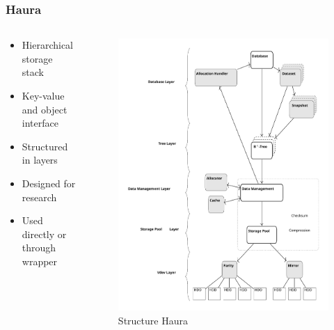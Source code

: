 \documentclass[
	aspectratio=169,
	compress,
]{beamer}
\newcommand{\navframetitle}[1]{\frametitle{#1\hfill{\footnotesize\lastsection{}}}}
\begin{document}
\begin{frame}
	\navframetitle{Haura}
	
	\begin{columns}
		\begin{column}{0.5\textwidth}
			\begin{itemize}
				\item Hierarchical storage stack
				\item Key-value and object interface
				\item Structured in layers
				\item Designed for research
				\item Used directly or through wrapper
			\end{itemize}
		\end{column}
		\begin{column}{0.5\textwidth}
			\begin{figure}[ht]
    			\centering
    			\includegraphics[scale=0.2]{overview_haura_level.pdf}
    			\caption{Structure Haura \cite{wiedemann2018modern}}
        		\label{fig:structure Haura}
			\end{figure}
		\end{column}
	\end{columns}
\end{frame}
\end{document}
